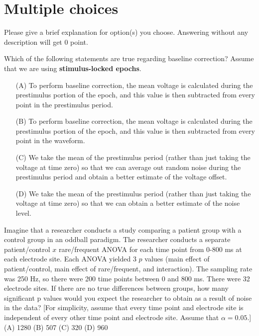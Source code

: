\documentclass[a4 paper]{article}
\begin{document}
\section{Multiple choices}
Please give a brief explanation for option(s) you choose. Answering without any description will get 0 point.
\begin{tcolorbox}[colback=RubineRed!5!white,colframe=RubineRed!75!black]
Which of the following statements are true regarding baseline correction? Assume that we are using \textbf{stimulus-locked epochs}.
\begin{itemize}
    \item[(A)]To perform baseline correction, the mean voltage is calculated during the prestimulus portion of the epoch, and this value is then subtracted from every point in the prestimulus period.
    \item[(B)]To perform baseline correction, the mean voltage is calculated during the prestimulus portion of the epoch, and this value is then subtracted from every point in the waveform.
    \item[(C)]We take the mean of the prestimulus period (rather than just taking the voltage at time zero) so that we can average out random noise during the prestimulus period and obtain a better estimate of the voltage offset.
    \item[(D)]We take the mean of the prestimulus period (rather than just taking the voltage at time zero) so that we can obtain a better estimate of the noise level.
\end{itemize}
\end{tcolorbox}
\begin{tcolorbox}[colback=RubineRed!5!white,colframe=RubineRed!75!black]
Imagine that a researcher conducts a study comparing a patient group with a control group in an oddball paradigm. The researcher conducts a separate patient/control $x$ rare/frequent ANOVA for each time point from 0-800 ms at each electrode site. Each ANOVA yielded 3 $p$ values (main effect of patient/control, main effect of rare/frequent, and interaction). The sampling rate was 250 Hz, so there were 200 time points between 0 and 800 ms. There were 32 electrode sites. If there are no true differences between groups, how many significant p values would you expect the researcher to obtain as a result of noise in the data? [For simplicity, assume that every time point and electrode site is independent of every other time point and electrode site. Assume that $\alpha=0.05$.]\\
(A) 1280 (B) 507 (C) 320 (D) 960
\end{tcolorbox}
\end{document}
